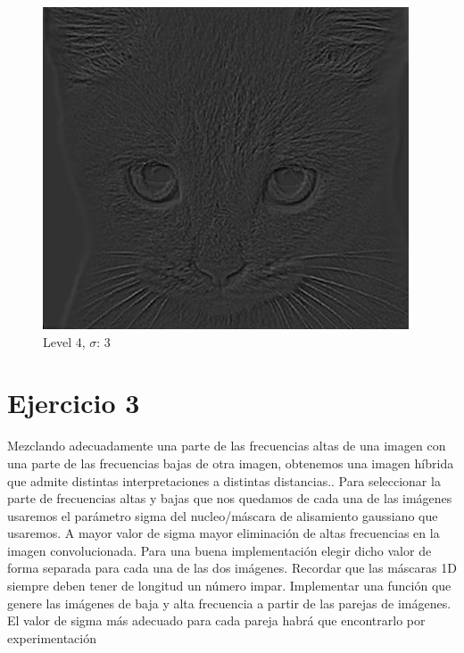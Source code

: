 \documentclass{article}
\begin{document}
\begin{minipage}{\linewidth}
     \begin{minipage}{0.45\linewidth}
        \begin{figure}[H]
            \includegraphics[width=\linewidth]{Ejercicio2e/cat4.png}          
			\caption{Level 4, $\sigma$: 3}
        \end{figure}
    \end{minipage}
\end{minipage}

\section*{Ejercicio 3}
Mezclando adecuadamente una parte de las frecuencias altas de una imagen con una parte de las frecuencias bajas de otra imagen, obtenemos una imagen híbrida que admite distintas interpretaciones a distintas distancias..
Para seleccionar la parte de frecuencias altas y bajas que nos quedamos de cada una de las imágenes usaremos el parámetro sigma del nucleo/máscara de alisamiento gaussiano que usaremos. A mayor valor de sigma mayor eliminación de altas frecuencias en la imagen convolucionada. Para una buena implementación elegir dicho valor de forma separada para cada una de las dos imágenes. Recordar que las máscaras 1D siempre deben tener de longitud un número impar.
Implementar una función que genere las imágenes de baja y alta frecuencia a partir de las parejas de imágenes. El valor de sigma más adecuado para cada pareja habrá que encontrarlo por experimentación
\end{document}

